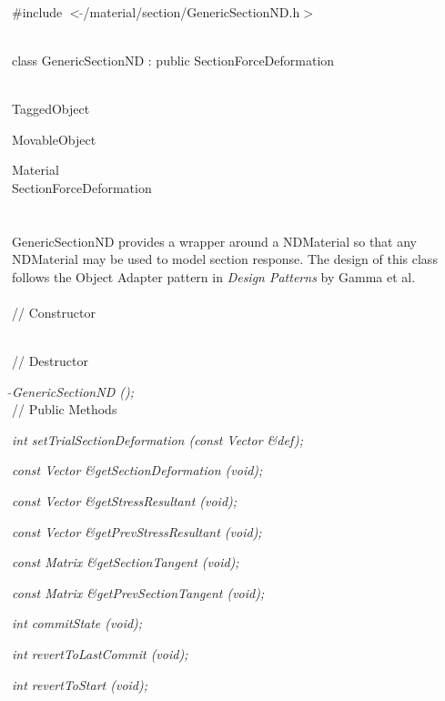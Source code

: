 
   \\
\#include $<\tilde{ }$/material/section/GenericSectionND.h$>$  


  \\
class GenericSectionND : public SectionForceDeformation 


 \\
TaggedObject 

MovableObject 

\indent\indent Material \\
\indent\indent\indent SectionForceDeformation \\
\indent\indent\indent{} \\

  \\
\indent GenericSectionND provides a wrapper around a NDMaterial
so that any NDMaterial may be used to model section response. 
The design of this class follows the Object Adapter pattern in 
{\em Design Patterns} by Gamma et al.\\

 \\
// Constructor 

 \\
// Destructor 

{\em $\tilde{ }$GenericSectionND ();}\\ 

// Public Methods 

{\em int setTrialSectionDeformation (const Vector \&def); } 

{\em const Vector \&getSectionDeformation (void); } 

{\em const Vector \&getStressResultant (void); } 

{\em const Vector \&getPrevStressResultant (void); } 

{\em const Matrix \&getSectionTangent (void); } 

{\em const Matrix \&getPrevSectionTangent (void); } 

{\em int commitState (void); } 

{\em int revertToLastCommit (void); } 

{\em int revertToStart (void); } 

